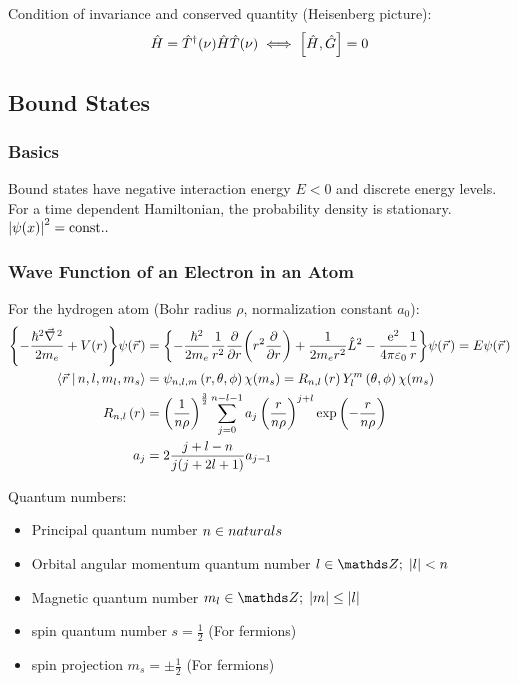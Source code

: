 			\noindent
			Condition of invariance  and conserved quantity (Heisenberg picture):
			\begin{equation}
				\hat{H} =\hat{T}^\dagger(\nu)\hat{H} \hat{T}(\nu) \iff \comm{\hat{H}}{\hat{G}} = 0
			\end{equation}

	\subsection{Bound States}
		\subsubsection{Basics}
			\noindent
			Bound states have negative interaction energy $E<0$ and discrete energy levels. For a time dependent Hamiltonian, the probability density is stationary.
			$\left|\psi(x)\right|^2=\mathrm{const.}.$

		\subsubsection{Wave Function of an Electron in an Atom}
			\noindent
			For the hydrogen atom (Bohr radius $\rho$, normalization constant $a_0$):
			\begin{equation}
				\begin{aligned}
					\qty{-\frac{\hbar^2 \Nabla^2}{2 m_e} + V(r)}\psi(\vec{r})
					&= \qty{-\frac{\hbar^2}{2 m_e}\frac{1}{r^2}\pdv{r}\qty(r^2\pdv{r}) + \frac{1}{2 m_e r^2} \hat{L}^2 - \frac{\ex^2}{4\pi\varepsilon_0}\frac{1}{r}}\psi(\vec{r})
					= E \psi\qty(\vec{r})
					\\
					\Braket{\vec{r}|n,l,m_l,m_s} &= \psi_{n,l,m}\left(r,\theta,\phi\right)\chi(m_s)
					= R_{n,l}\left(r\right) Y_l^m\left(\theta,\phi\right)\chi(m_s) \\
					R_{n,l}\left(r\right)
					&= \left(\frac{1}{n\rho}\right)^{\frac{3}{2}}
					\sum_{j=0}^{n-l-1} a_j \left(\frac{r}{n\rho}\right)^{j+l} \exp\left({-\frac{r}{n\rho}}\right) \\
					a_j &= 2\frac{j+l-n}{j(j+2l+1)} a_{j-1} \\
				\end{aligned}
			\end{equation}

			\noindent
			Quantum numbers:
			\begin{itemize}
				\item Principal quantum number $n \in \\naturals $
				\item Orbital angular momentum quantum number $l \in \integers;\; \left|l\right| < n$
				\item Magnetic quantum number $m_l \in \integers;\; \left|m\right| \le \left|l\right|$
				\item spin quantum number $s = \frac{1}{2}$ (For fermions)
				\item spin projection $m_s = \pm \frac{1}{2}$ (For fermions)
			\end{itemize}


